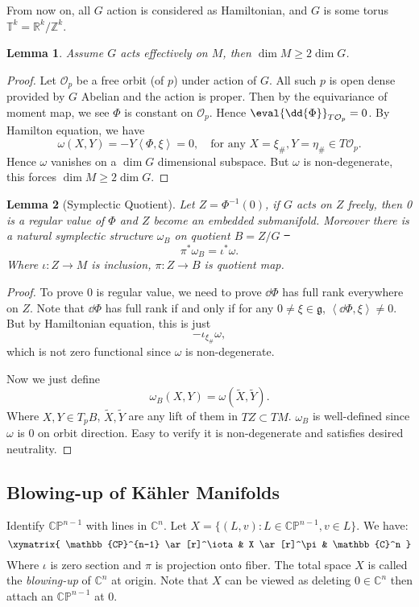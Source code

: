 \documentclass[12pt]{article}
\theoremstyle{plain}\newtheorem{theorem}{Theorem}
\theoremstyle{definition}\newtheorem{definition}[theorem]{Definition}
\theoremstyle{definition}\newtheorem{example}[theorem]{Example}
\theoremstyle{plain}\newtheorem{axiom}[theorem]{Axiom}
\theoremstyle{plain}\newtheorem{assertion}[theorem]{Assertion}
\theoremstyle{plain}\newtheorem{corollary}[theorem]{Corollary}
\theoremstyle{plain}\newtheorem{lemma}[theorem]{Lemma}
\theoremstyle{plain}\newtheorem{proposition}[theorem]{Proposition}
\theoremstyle{plain}\newtheorem{prop}[theorem]{Proposition}
\theoremstyle{plain}\newtheorem{conjecture}[theorem]{Conjecture}
\theoremstyle{plain}\newtheorem{conj}[theorem]{Conjecture}
\theoremstyle{plain}\newtheorem{problem}[theorem]{Problem}
\theoremstyle{remark}\newtheorem{notation}[theorem]{Notation}
\theoremstyle{definition}\newtheorem*{question}{Question}
\theoremstyle{definition}\newtheorem*{answer}{Answer}
\theoremstyle{definition}\newtheorem*{goal}{Goal}
\theoremstyle{plain}\newtheorem*{application}{Application}
\theoremstyle{plain}\newtheorem*{exercise}{Exercise}
\theoremstyle{remark}\newtheorem*{remark}{Remark}
\theoremstyle{remark}\newtheorem*{note}{\small{Note}}
\numberwithin{equation}{section}
\numberwithin{theorem}{section}
\numberwithin{figure}{section}
\begin{document}
From now on, all \(G\) action is considered as Hamiltonian, and \(G\) is some torus
\(\mathbb{T}^k=\mathbb{R}^k/\mathbb{Z}^k\).

\begin{lemma}
    Assume \(G\) acts effectively on \(M\), then \(\dim M\ge 2\dim G\).
\end{lemma}
\begin{proof}
    Let \(\mathcal{O}_p\) be a free orbit (of \(p\)) under action of \(G\). All such
    \(p\) is open dense provided by \(G\) Abelian and the action is proper. Then by
    the equivariance of moment map, we see \(\Phi\) is constant on \(\mathcal{O}_p\).
    Hence \(\eval{\dd{\Phi}}_{T\mathcal{O}_p}=0\). By Hamilton equation, we have \[
        \omega(X,Y)=-Y\left<\Phi,\xi\right> =0,\quad
        \text{for any }X=\xi_\#,Y=\eta_\#\in T\mathcal{O}_p
    .\] Hence \(\omega\) vanishes on a \(\dim G\) dimensional subspace.
    But \(\omega\) is non-degenerate, this forces \(\dim M\ge 2\dim G\).
\end{proof}

\begin{lemma}[Symplectic Quotient]\label{thm:symplectic-quotient}
    Let \(Z=\Phi^{-1}(0)\), if \(G\) acts on \(Z\) freely, then 0 is a regular
    value of \(\Phi\) and \(Z\) become an embedded submanifold. Moreover
    there is a natural symplectic structure \(\omega_B\) on quotient \(B=Z/G\) \st\ \[
        \pi^*\omega_B=\iota^*\omega
    .\] Where \(\iota\colon Z\to M\) is inclusion, \(\pi\colon Z\to B\) is quotient
    map.
\end{lemma}
\begin{proof}
    To prove 0 is regular value, we need to prove \(\dd{\Phi}\) has full rank
    everywhere on \(Z\). Note that \(\dd{\Phi}\) has full rank if and only if for
    any \(0\neq \xi\in \mathfrak{g}\), \(\left<\dd{\Phi},\xi\right> \neq 0\). But by
    Hamiltonian equation, this is just \[
        -\iota_{\xi_{\#}}\omega
    ,\] which is not zero functional since \(\omega\) is non-degenerate.

    Now we just define \[
        \omega_B(X,Y)=\omega(\tilde{X},\tilde{Y})
    .\] Where \(X,Y\in T_p B\), \(\tilde{X},\tilde{Y}\) are any lift of them in
    \(TZ\subset TM\). \(\omega_B\) is well-defined since \(\omega\) is 0 on orbit
    direction. Easy to verify it is non-degenerate and satisfies desired neutrality.
\end{proof}

\subsection{Blowing-up of K\"ahler Manifolds}
Identify \(\mathbb{CP}^{n-1}\) with lines in \(\mathbb{C}^n\). Let \(X=\{(L,v):
L\in \mathbb{CP}^{n-1},v\in L\}\). We have: \[
\xymatrix{
    \mathbb{CP}^{n-1} \ar[r]^\iota & X \ar[r]^\pi & \mathbb{C}^n
}\] Where \(\iota\) is zero section and \(\pi\) is projection onto fiber. The total
space \(X\) is called the \emph{blowing-up} of \(\mathbb{C}^n\) at origin.
Note that \(X\) can be viewed as deleting \(0\in \mathbb{C}^n\) then attach an
\(\mathbb{CP}^{n-1}\) at \(0\).
\end{document}

